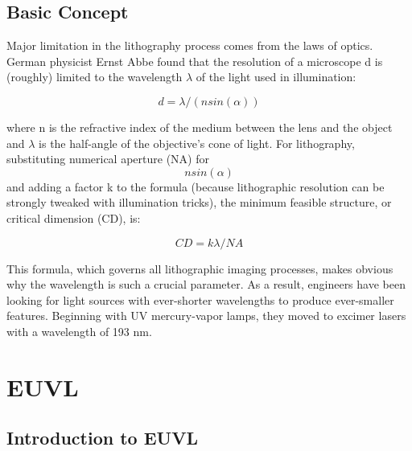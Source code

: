 \documentclass[12pt,a4paper]{report}
\begin{document}
\section{Basic Concept}
Major limitation in the lithography process comes from 
the laws of optics. 
German physicist Ernst Abbe found that the resolution 
of a microscope d is 
(roughly) limited to the 
wavelength $\lambda$ of the light used in illumination:

$$d =\lambda/(nsin(\alpha))$$


where n is the refractive index of the medium between the 
lens and the object and 
$\lambda$ is the half-angle of the objective's cone of 
light. For lithography, substituting
numerical aperture (NA) for $$nsin(\alpha)$$ and adding 
a factor k to the formula 
(because lithographic resolution can be strongly tweaked 
with illumination tricks),
the minimum feasible structure, or critical dimension 
(CD), is:

$$CD = {k}{\lambda}/NA$$


This formula, which governs all lithographic imaging processes, makes 
obvious why the wavelength is such a crucial parameter. As a result, 
engineers have been looking for light sources with ever-shorter 
wavelengths to produce ever-smaller features. Beginning with UV
 mercury-vapor lamps, they moved to excimer lasers with a wavelength of 193 nm. 



\chapter{EUVL}
\section{Introduction to EUVL}
\end{document}
